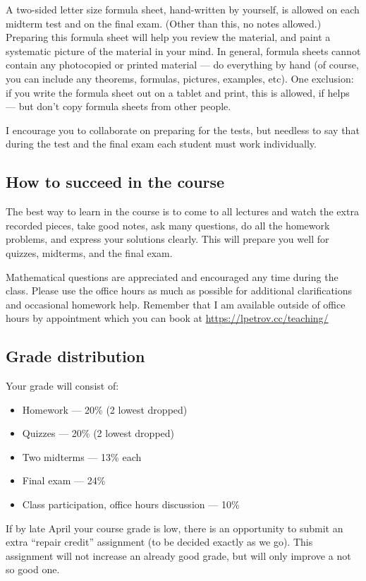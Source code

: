 \documentclass[oneside,11pt]{amsart}
\begin{document}
\medskip

A two-sided letter size formula sheet, hand-written by yourself, is
allowed on each midterm test and on the final exam.
(Other than this, no notes allowed.)
Preparing this formula sheet
will help you review the material, and paint a systematic picture of the material in your mind.
In general, formula sheets cannot contain any photocopied or
printed material --- do everything by hand (of course, you can
include any theorems, formulas, pictures, examples, etc).
One exclusion: if you write the formula sheet out on a
tablet and print, this is allowed, if helps --- but don't copy
formula sheets from other people.

I encourage you to collaborate on preparing for the tests, but needless to say that
during the test and the final exam each student must work individually.

\subsection*{How to succeed in the course}

The best way to learn in the course is to come to all lectures and watch the extra recorded pieces, take good notes,
ask many questions,
do all the homework problems, and express your solutions
clearly.
This will prepare you well for quizzes, midterms, and the final exam.

Mathematical questions are appreciated and encouraged any time during the
class. Please use the office hours as much as possible for additional
clarifications and occasional homework help. Remember that I am available outside 
of office hours by appointment which you can book at
\url{https://lpetrov.cc/teaching/}

\subsection{Grade distribution}

Your grade will consist of:
\begin{itemize}
	\item Homework --- 20\% (2 lowest dropped)
	\item Quizzes --- 20\% (2 lowest dropped)
	\item Two midterms --- 13\% each
	\item Final exam --- 24\%
	\item Class participation, office hours discussion --- 10\%
\end{itemize}
If by late April your course grade is low, there is an opportunity to submit an extra
``repair credit'' assignment (to be decided exactly as we go). This assignment will not 
increase an already good grade, but will only improve a not so good one.
\end{document}

